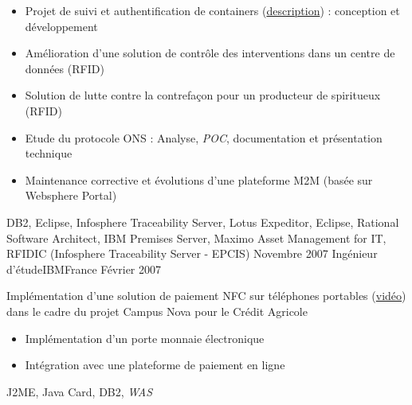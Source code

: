 \begin{experiences}
{\begin{itemize}
                        \item Projet de suivi et authentification de containers (\href{http://www.container-centralen.co.uk/rfid/history.aspx}{description}) : conception et développement
                        \item Amélioration d'une solution de contrôle des interventions dans un centre de données (RFID)
                        \item Solution de lutte contre la contrefaçon pour un producteur de spiritueux (RFID)           
                        \item Etude du protocole ONS : Analyse, \emph{POC}, documentation et présentation technique     
                        \item Maintenance corrective et évolutions d'une plateforme M2M (basée sur Websphere Portal)    
                      \end{itemize}
                    }
                    {
                      DB2, Eclipse, Infosphere Traceability Server, Lotus Expeditor, Eclipse, 
                      Rational Software Architect, IBM Premises Server, Maximo Asset Management for IT, RFIDIC (Infosphere Traceability Server - EPCIS)
                    }
  \emptySeparator
  \experience
  {Novembre 2007}  {Ingénieur d'étude}{IBM}{France}
  {Février 2007}   {
                      Implémentation d'une solution de paiement NFC sur téléphones portables (\href{http://www.nouvo.ch/s-007}{vidéo}) 
                      dans le cadre du projet Campus Nova pour le Crédit Agricole  
                      \begin{itemize}
                        \item Implémentation d'un porte monnaie électronique                                            
                        \item Intégration avec une plateforme de paiement en ligne  
                      \end{itemize}
                  }
                  {J2ME, Java Card, DB2, \emph{WAS}}  
\end{experiences}
